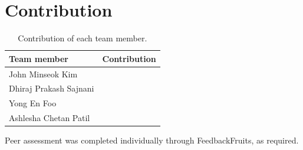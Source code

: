 
\section{Contribution}

\begin{table}[htbp]
\centering
\caption{Contribution of each team member.}
\label{tab:contrib}
\small
\begin{tabularx}{\textwidth}{@{}lX@{}}
\toprule
\textbf{Team member} & \textbf{Contribution} \\
\midrule
John Minseok Kim       & \FILL{} \\
Dhiraj Prakash Sajnani & \FILL{} \\
Yong En Foo            & \FILL{} \\
Ashlesha Chetan Patil  & \FILL{} \\
\bottomrule
\end{tabularx}
\end{table}

Peer assessment was completed individually through FeedbackFruits, as required.
